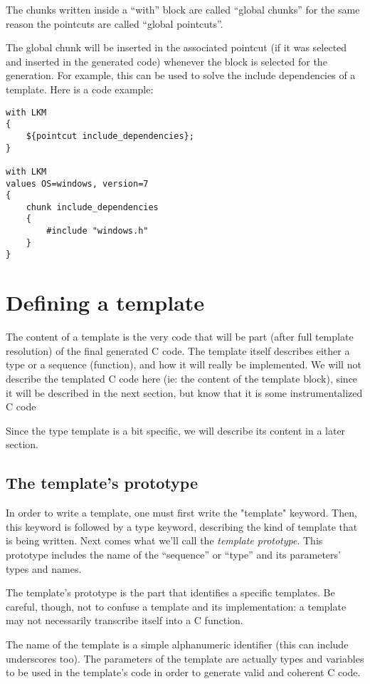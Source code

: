 \documentclass[american]{rtxreport}
\begin{document}
The chunks written inside a ``with'' block are called ``global chunks'' for the
same reason the pointcuts are called ``global pointcuts''.

The global chunk will be inserted in the associated pointcut (if it was
selected and inserted in the generated code) whenever the block is selected for
the generation. For example, this can be used to solve the include dependencies
of a template. Here is a code example:

\begin{lstlisting}
with LKM
{
    ${pointcut include_dependencies};
}

with LKM
values OS=windows, version=7
{
    chunk include_dependencies
    {
        #include "windows.h"
    }
}
\end{lstlisting}


\chapter{Defining a template}

The content of a template is the very code that will be part (after full
template resolution) of the final generated C code. The template itself
describes either a type or a sequence (\rtx function), and how it
will really be implemented. We will not describe the templated C code here
(ie: the content of the template block), since it will be described in the next
section, but know that it is some instrumentalized C code

Since the type template is a bit specific, we will describe its content in a
later section.

\section{The template's prototype}

In order to write a template, one must first write the "template" keyword.
Then, this keyword is followed by a type keyword, describing the kind of
template that is being written. Next comes what we'll call the \emph{template
prototype}. This prototype includes the name of the ``sequence'' or ``type''
and its parameters' types and names.

The template's prototype is the part that identifies a specific templates.
Be careful, though, not to confuse a template and its implementation: a
template may not necessarily transcribe itself into a C function.

The name of the template is a simple alphanumeric identifier (this can include
underscores too). The parameters of the template are actually \rtx types and
variables to be used in the template's code in order to generate valid and
coherent C code.
\end{document}
